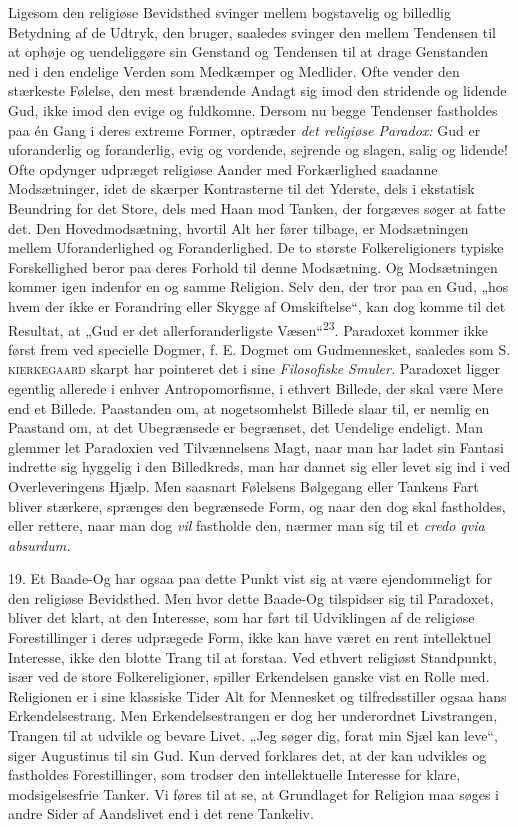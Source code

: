 \documentclass[12pt,a4paper,openany]{book}
\newcommand{\opage}[1]{\marginnote{\footnotesize\textit{[#1]}}}
\begin{document}
Ligesom den religiøse Bevidsthed svinger mellem bogstavelig og billedlig
Betydning af de Udtryk, den bruger, saaledes svinger den mellem
Tendensen til at ophøje og uendeliggøre sin Genstand og Tendensen til at
drage Genstanden ned i den endelige Verden som Medkæmper og Medlider.
Ofte vender den
\opage{48}stærkeste Følelse, den mest brændende Andagt sig imod den
stridende og lidende Gud, ikke imod den evige og fuldkomne. Dersom nu
begge Tendenser fastholdes paa én Gang i deres extreme Former, optræder
\textit{det religiøse Paradox:} Gud er uforanderlig og foranderlig, evig
og vordende, sejrende og slagen, salig og lidende! Ofte opdynger
udpræget religiøse Aander med Forkærlighed saadanne Modsætninger, idet
de skærper Kontrasterne til det Yderste, dels i ekstatisk Beundring for
det Store, dels med Haan mod Tanken, der forgæves søger at fatte det.
Den Hovedmodsætning, hvortil Alt her fører tilbage, er Modsætningen
mellem Uforanderlighed og Foranderlighed. De to største Folkereligioners
typiske Forskellighed beror paa deres Forhold til denne Modsætning. Og
Modsætningen kommer igen indenfor en og samme Religion. Selv den, der
tror paa en Gud, „hos hvem der ikke er Forandring eller Skygge af
Omskiftelse“, kan dog komme til det Resultat, at „Gud er det
allerforanderligste Væsen“\textsuperscript{23}. Paradoxet kommer ikke
først frem ved specielle Dogmer, f. E. Dogmet om Gudmennesket, saaledes
som \textsc{S. kierkegaard} skarpt har pointeret det i sine
\textit{Filosofiske Smuler.} Paradoxet ligger egentlig allerede i enhver
Antropomorfisme, i ethvert Billede, der skal være Mere end et Billede.
Paastanden om, at nogetsomhelst Billede slaar til, er nemlig en Paastand
om, at det Ubegrænsede er begrænset, det Uendelige endeligt. Man glemmer
let Paradoxien ved Tilvænnelsens Magt, naar man har ladet sin Fantasi
indrette sig hyggelig i den Billedkreds, man har dannet sig eller levet
sig ind i ved Overleveringens Hjælp. Men saasnart Følelsens Bølgegang
eller Tankens Fart bliver stærkere, sprænges den begrænsede Form, og
naar den dog skal fastholdes, eller rettere, naar man dog \textit{vil}
fastholde den, nærmer man sig til et \textit{credo qvia absurdum.}

19. Et Baade-Og har ogsaa paa dette Punkt vist sig at være ejendommeligt
for den religiøse Bevidsthed. Men hvor dette Baade-Og tilspidser sig til
Paradoxet, bliver det klart, at den Interesse, som har ført til
Udviklingen af de religiøse Forestillinger i deres udprægede Form, ikke
kan have været en rent intellektuel Interesse, ikke den blotte Trang til
at forstaa. Ved ethvert religiøst Standpunkt, især ved de store
Folkereligioner, spiller Erkendelsen ganske vist en Rolle med.
Religionen er i sine klassiske Tider Alt for Mennesket og
tilfredsstiller ogsaa hans Erkendelsestrang. Men Erkendelsestrangen er
dog her underordnet Livstrangen, Trangen til at udvikle og bevare Livet.
„Jeg søger dig,
\opage{49}forat min Sjæl kan leve“, siger Augustinus til sin Gud. Kun
derved forklares det, at der kan udvikles og fastholdes Forestillinger,
som trodser den intellektuelle Interesse for klare, modsigelsesfrie
Tanker. Vi føres til at se, at Grundlaget for Religion maa søges i andre
Sider af Aandslivet end i det rene Tankeliv.
\end{document}
